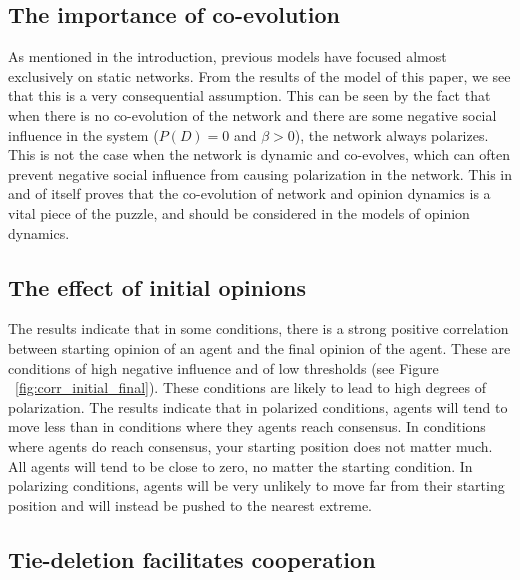 \documentclass{article}
\begin{document}
\subsection{The importance of co-evolution}
As mentioned in the introduction, previous models have focused almost exclusively on static networks.
From the results of the model of this paper, we see that this is a very consequential assumption. 
This can be seen by the fact that when there is no co-evolution of the network and there are some negative social influence in the system ($P(D) = 0$ and $\beta > 0$), the network always polarizes.
This is not the case when the network is dynamic and co-evolves, which can often prevent negative social influence from causing polarization in the network.
This in and of itself proves that the co-evolution of network and opinion dynamics is a vital piece of the puzzle, and should be considered in the models of opinion dynamics. 

\subsection{The effect of initial opinions}

The results indicate that in some conditions, there is a strong positive correlation between starting opinion of an agent and the final opinion of the agent. 
These are conditions of high negative influence and of low thresholds (see Figure ~\ref{fig:corr_initial_final}). These conditions are likely to lead to high degrees of polarization. The results indicate that in polarized conditions, agents will tend to move less than in conditions where they agents reach consensus. In conditions where agents do reach consensus, your starting position does not matter much. All agents will tend to be close to zero, no matter the starting condition. In polarizing conditions, agents will be very unlikely to move far from their starting position and will instead be pushed to the nearest extreme. 

\subsection{Tie-deletion facilitates cooperation}
\end{document}
